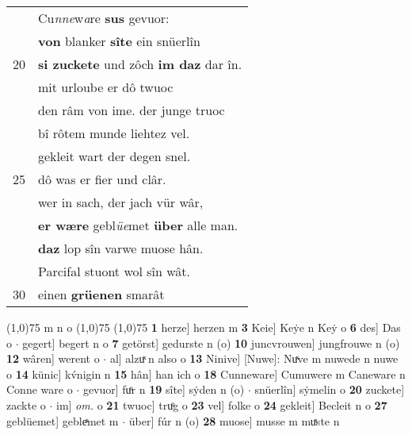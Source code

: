 \documentclass[8pt,a4paper,notitlepage]{article}
\begin{document}
\begin{table}[ht]
\begin{minipage}[t]{0.5\linewidth}
\begin{tabular}{rl}
 & Cu\textit{nne}w\textit{a}re \textbf{sus} gevuor:\\ 
 & \textbf{von} blanker \textbf{sîte} ein snüerlîn\\ 
20 & \textbf{si zuckete} und zôch \textbf{im daz} dar în.\\ 
 & mit urloube er dô twuoc\\ 
 & den râm von ime. der junge truoc\\ 
 & bî rôtem munde liehtez vel.\\ 
 & gekleit wart der degen snel.\\ 
25 & dô was er fier und clâr.\\ 
 & wer in sach, der jach vür wâr,\\ 
 & \textbf{er wære} gebl\textit{üe}met \textbf{über} alle man.\\ 
 & \textbf{daz} lop sîn varwe muose hân.\\ 
 & Parcifal stuont wol sîn wât.\\ 
30 & einen \textbf{grüenen} smarât\\ 
\end{tabular}
\scriptsize
\line(1,0){75} \newline
m n o \newline
\line(1,0){75} \newline
\newline
\line(1,0){75} \newline
\textbf{1} herze] herzen m \textbf{3} Keie] Keẏe n Keẏ o \textbf{6} des] Das o  $\cdot$ gegert] begert n o \textbf{7} getörst] gedurste n (o) \textbf{10} juncvrouwen] jungfrouwe n (o) \textbf{12} wâren] werent o  $\cdot$ al] alzuͯ n also o \textbf{13} Ninive] [Nuwe]: Nuͯve m nuwede n nuwe o \textbf{14} künic] kv́nigin n \textbf{15} hân] han ich o \textbf{18} Cunneware] Cumuwere m Caneware n Conne ware o  $\cdot$ gevuor] fuͦr n \textbf{19} sîte] sẏden n (o)  $\cdot$ snüerlîn] sẏmelin o \textbf{20} zuckete] zackte o  $\cdot$ im] \textit{om.} o \textbf{21} twuoc] truͦg o \textbf{23} vel] folke o \textbf{24} gekleit] Becleit n o \textbf{27} geblüemet] gebleͯmet m  $\cdot$ über] fúr n (o) \textbf{28} muose] musse m muͯste n \newline
\end{minipage}
\end{table}
\newpage
\end{document}

